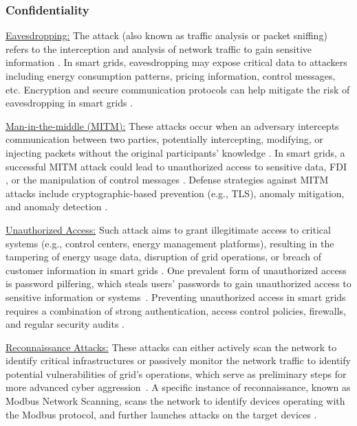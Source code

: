 \documentclass[10pt, journal]{IEEEtran}
\begin{document}
\vspace{0.15cm}		
\subsubsection{Confidentiality}

\underline{Eavesdropping:} The attack (also known as traffic analysis or packet sniffing) refers to the interception and analysis of network traffic to gain sensitive information \cite{baig2013analysis}. In smart grids, eavesdropping may expose critical data to attackers including energy consumption patterns, pricing information, control messages, etc. Encryption and secure communication protocols can help mitigate the risk of eavesdropping in smart grids \cite{valli2012eavesdropping,tyav2022comprehensive}. 
			
\underline{Man-in-the-middle (MITM):} These attacks occur when an adversary intercepts communication between two parties, potentially intercepting, modifying, or injecting packets without the original participants' knowledge \cite{gunduz2018analysis}. In smart grids, a successful MITM attack could lead to unauthorized access to sensitive data, FDI , or the manipulation of control messages \cite{wlazlo2021man}. Defense strategies against MITM attacks include cryptographic-based prevention (e.g., TLS), anomaly mitigation, and anomaly detection \cite{conti2016survey}.
		
\underline{Unauthorized Access:} Such attack aims to grant illegitimate access to critical systems (e.g., control centers, energy management platforms), resulting in the tampering of energy usage data, disruption of grid operations, or breach of customer information in smart grids \cite{komninos2014survey}. One prevalent form of unauthorized access is password pilfering, which steals users' passwords to gain unauthorized access to sensitive information or systems~\cite{yang2011impact}. Preventing unauthorized access in smart grids requires a combination of strong authentication, access control policies, firewalls, and regular security audits \cite{rawat2015cyber, sun2018cyber}.
		
\underline{Reconnaissance Attacks:} These attacks can either actively scan the network to identify critical infrastructures or passively monitor the network traffic to identify potential vulnerabilities of grid's operations, which serve as preliminary steps for more advanced cyber aggression~\cite{gonzalez2008passive}. A specific instance of reconnaissance, known as Modbus Network Scanning, scans the network to identify devices operating with the Modbus protocol, and further launches attacks on the target devices \cite{bristow2008modscan}. 
\end{document}
